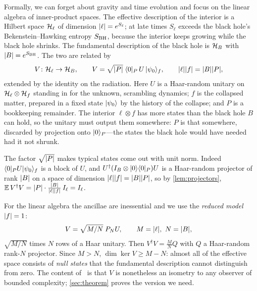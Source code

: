 Formally, we can forget about gravity and time evolution and focus on the linear algebra of inner-product spaces.
The effective description of the interior is a Hilbert space $\mathcal H_\ell$ of dimension $\lvert \ell\rvert=e^{S_\ell}$; at
late times $S_\ell$ exceeds the black hole's Bekenstein--Hawking entropy $S_{\rm BH}$, because the interior keeps
growing while the black hole shrinks. The fundamental description of the black hole is $\mathcal H_B$ with
$\lvert B\rvert=e^{S_{\rm BH}}$. The two are related by
\begin{equation}\label{eq:V}
V\colon\mathcal H_\ell\to\mathcal H_B,\qquad V=\sqrt{\lvert P\rvert}\;\langle 0|_P\,U\,|\psi_0\rangle_f ,\qquad \lvert \ell\rvert\lvert f\rvert=\lvert B\rvert\lvert P\rvert,
\end{equation}
extended by the identity on the radiation. Here $U$ is a Haar-random unitary on $\mathcal H_\ell\otimes\mathcal H_f$ standing
in for the unknown, scrambling dynamics; $f$ is the collapsed matter, prepared in a fixed state $|\psi_0\rangle$ by the
history of the collapse; and $P$ is a bookkeeping remainder. The interior $\ell\otimes f$ has more states than the
black hole $B$ can hold, so the unitary must output them somewhere: $P$ is that somewhere, discarded by projection
onto $|0\rangle_P$---the states the black hole would have needed had it not shrunk.

The factor $\sqrt{\lvert P\rvert}$ makes typical states come out with unit norm. Indeed
$\langle 0|_PU|\psi_0\rangle_f$ is a block of $U$, and $U^\dagger(I_B\otimes|0\rangle\langle 0|_P)U$ is a Haar-random projector of
rank $\lvert B\rvert$ on a space of dimension $\lvert \ell\rvert\lvert f\rvert=\lvert B\rvert\lvert P\rvert$, so by \cref{lem:projectors},
$\mathbb E\,V^\dagger V=\lvert P\rvert\cdot\frac{\lvert B\rvert}{\lvert \ell\rvert\lvert f\rvert}\,I_\ell=I_\ell$.

For the linear algebra the ancillae are inessential and we use the \emph{reduced model} $\lvert f\rvert=1$:
\begin{equation}\label{eq:reduced}
V=\sqrt{M/N}\;P_NU,\qquad M=\lvert \ell\rvert,\ N=\lvert B\rvert,
\end{equation}
$\sqrt{M/N}$ times $N$ rows of a Haar unitary. Then $V^\dagger V=\frac MN Q$ with $Q$ a Haar-random rank-$N$
projector. Since $M>N$, $\dim\ker V\ge M-N$: almost all of the effective space consists of \emph{null states}
that the fundamental description cannot distinguish from zero. The content of~\cite{AEHPV} is that $V$ is
nonetheless an isometry to any observer of bounded complexity; \cref{sec:theorem} proves the version we need.

